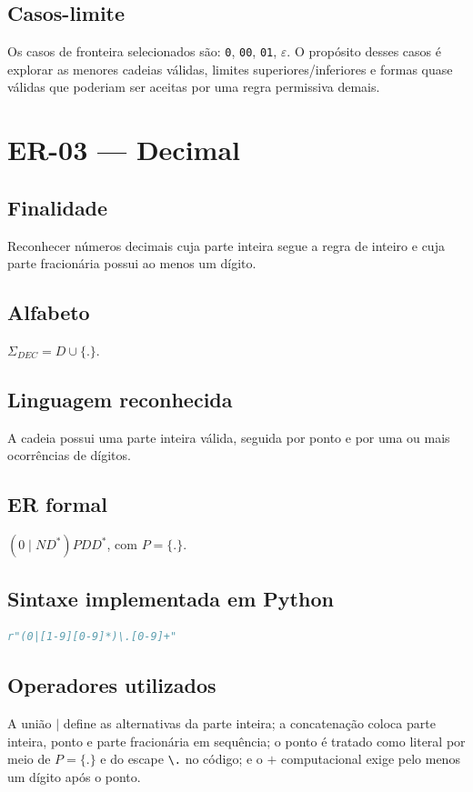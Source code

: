 \documentclass[12pt,a4paper,oneside]{report}
\begin{document}
\subsection{Casos-limite}
Os casos de fronteira selecionados são: \texttt{0}, \texttt{00}, \texttt{01}, $\varepsilon$.
\medskip
O propósito desses casos é explorar as menores cadeias válidas, limites superiores/inferiores e formas quase válidas que poderiam ser aceitas por uma regra permissiva demais.

\section{ER-03 --- Decimal}
\subsection{Finalidade}
Reconhecer números decimais cuja parte inteira segue a regra de inteiro e cuja parte fracionária possui ao menos um dígito.
\subsection{Alfabeto}
$\Sigma_{DEC}=D\cup\{.\}$.
\subsection{Linguagem reconhecida}
A cadeia possui uma parte inteira válida, seguida por ponto e por uma ou mais ocorrências de dígitos.
\subsection{ER formal}
$(0\mid ND^*)PDD^*$, com $P=\{.\}$.
\subsection{Sintaxe implementada em Python}
\begin{lstlisting}[language=Python]
r"(0|[1-9][0-9]*)\.[0-9]+"
\end{lstlisting}
\subsection{Operadores utilizados}
A união $\mid$ define as alternativas da parte inteira; a concatenação coloca parte inteira, ponto e parte fracionária em sequência; o ponto é tratado como literal por meio de $P=\{.\}$ e do escape \texttt{\textbackslash.} no código; e o $+$ computacional exige pelo menos um dígito após o ponto.
\end{document}
